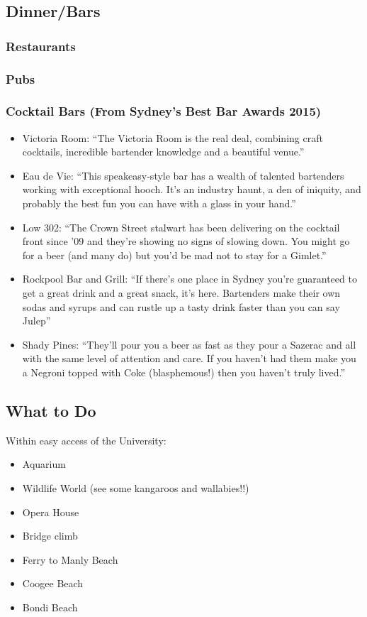 \subsection*{Dinner/Bars}

\subsubsection*{Restaurants}


\subsubsection*{Pubs}

\subsubsection*{Cocktail Bars (From Sydney's Best Bar Awards 2015)}
\begin{itemize}
 \item Victoria Room: ``The Victoria Room is the real deal, combining craft cocktails, incredible bartender knowledge and a beautiful venue.''
\item Eau de Vie: ``This speakeasy-style bar has a wealth of talented bartenders working with exceptional hooch. It’s an industry haunt, a den of iniquity, and probably the best fun you can have with a glass in your hand.''
\item Low 302: ``The Crown Street stalwart has been delivering on the cocktail front since ’09 and they’re showing no signs of slowing down. You might go for a beer (and many do) but you’d be mad not to stay for a Gimlet.''
\item Rockpool Bar and Grill: ``If there’s one place in Sydney you’re guaranteed to get a great drink and a great snack, it’s here. Bartenders make their own sodas and syrups and can rustle up a tasty drink faster than you can say Julep''
\item Shady Pines: ``They’ll pour you a beer as fast as they pour a Sazerac and all with the same level of attention and care. If you haven’t had them make you a Negroni topped with Coke (blasphemous!) then you haven’t truly lived.''
\end{itemize}

{}
\subsection*{What to Do}
Within easy access of the University:
\begin{itemize}
 \item Aquarium
\item Wildlife World (see some kangaroos and wallabies!!)
\item Opera House
\item Bridge climb
\item Ferry to Manly Beach
\item Coogee Beach
\item Bondi Beach
\end{itemize}

